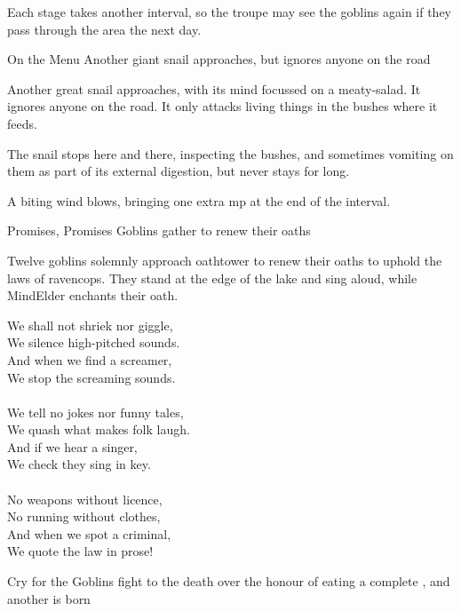 Each stage takes another \gls{interval}, so the troupe may see the goblins again if they pass through the area the next day.

{On the Menu}%
{Another giant snail approaches, but ignores anyone on the road}%

Another great snail approaches, with its mind focussed on a meaty-salad.
It ignores anyone on the road.
It only attacks living things in the bushes where it feeds.

The snail stops here and there, inspecting the bushes, and sometimes vomiting on them as part of its external digestion, but never stays for long.

A biting wind blows, bringing one extra \gls{mp} at the end of the \gls{interval}.

{Promises, Promises}%
{Goblins gather to renew their oaths}%

Twelve goblins solemnly approach \gls{oathtower} to renew their oaths to uphold the laws of \gls{ravencops}.
They stand at the edge of the lake and sing aloud, while \gls{MindElder} enchants their oath.

\label{ravencopsLaws}
\begin{speechtext}
  We shall not shriek nor giggle, \\
  We silence high-pitched sounds. \\
  And when we find a screamer, \\
  We stop the screaming sounds. \\
  \\
  We tell no jokes nor funny tales, \\
  We quash what makes folk laugh. \\
  And if we hear a singer, \\
  We check they sing in key. \\
  \\
  No weapons without licence, \\
  No running without clothes, \\
  And when we spot a criminal, \\
  We quote the law in prose!
\end{speechtext}

{Cry for the }%
{Goblins fight to the death over the honour of eating a complete , and another  is born}%

